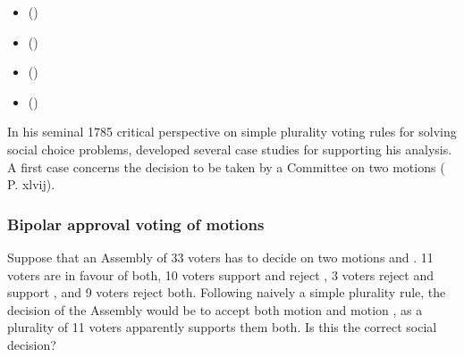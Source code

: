 \documentclass[a4paper,12pt,english]{sphinxhowto}
\begin{document}
\begin{sphinxcontents}
\begin{itemize}
\item {} 
\sphinxAtStartPar
{}\label{\detokenize{pearls:id122}}{\hyperref[\detokenize{pearls:bipolar-approval-voting-of-motions}]{}} ()

\item {} 
\sphinxAtStartPar
{}\label{\detokenize{pearls:id123}}{\hyperref[\detokenize{pearls:who-wins-the-election}]{}} ()

\item {} 
\sphinxAtStartPar
{}\label{\detokenize{pearls:id124}}{\hyperref[\detokenize{pearls:resolving-circular-social-preferences}]{}} ()

\item {} 
\sphinxAtStartPar
{}\label{\detokenize{pearls:id125}}{\hyperref[\detokenize{pearls:the-borda-rank-analysis-method}]{}} ()

\end{itemize}
\end{sphinxcontents}

\sphinxAtStartPar
In his seminal 1785 critical perspective on simple plurality voting rules for solving social choice problems,  developed several case studies for supporting his analysis. A first case concerns the decision to be taken by a Committee on two motions ( P. xlvij).


\subsubsection{Bipolar approval voting of motions}
\label{\detokenize{pearls:bipolar-approval-voting-of-motions}}
\sphinxAtStartPar
Suppose that an Assembly of 33 voters has to decide on two motions  and . 11 voters are in favour of both, 10 voters support  and reject , 3 voters reject  and support , and 9 voters reject both. Following naively a simple plurality rule, the decision of the Assembly would be to accept both motion  and motion , as a plurality of 11 voters apparently supports them both. Is this the correct social decision?
\end{document}
